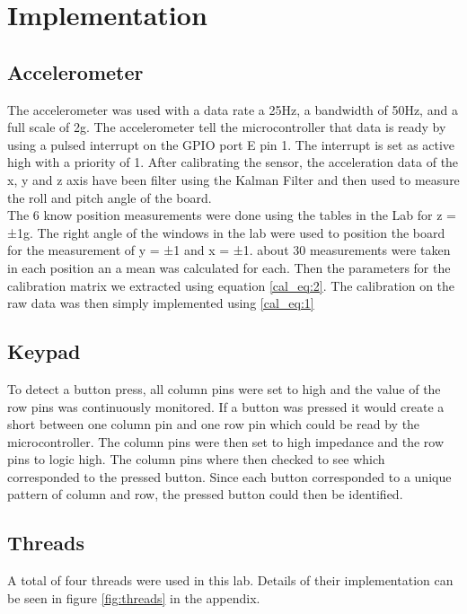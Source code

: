 \documentclass[12pt]{article}
\begin{document}
\section{Implementation}
\subsection{Accelerometer}
The accelerometer was used with a data rate a 25Hz, a bandwidth of 50Hz, and a full scale of 2g. The accelerometer tell the microcontroller that data is ready by using a pulsed interrupt on the GPIO port E pin 1. The interrupt is set as active high with a priority of 1. After calibrating the sensor, the acceleration data of the x, y and z axis have been filter using the Kalman Filter and then used to measure the roll and pitch angle of the board. \\

The 6 know position measurements were done using the tables in the Lab for z = ±1g. The right angle of the windows in the lab were used to position the board for the measurement of y = ±1 and x = ±1. about 30 measurements were taken in each position an a mean was calculated for each. Then the parameters for the calibration matrix we extracted using equation \ref{cal_eq:2}. The calibration on the raw data was then simply implemented using \ref{cal_eq:1}

\subsection{Keypad}
\label{implementation:keypad}
To detect a button press, all column pins were set to high and the value of the row pins was continuously monitored. If a button was pressed it would create a short between one column pin and one row pin which could be read by the microcontroller. The column pins were then set to high impedance and the row pins to logic high. The column pins where then checked to see which corresponded to the pressed button. Since each button corresponded to a unique pattern of column and row, the pressed button could then be identified.

\subsection{Threads}
A total of four threads were used in this lab. Details of their implementation can be seen in figure \ref{fig:threads} in the appendix.
\end{document}
